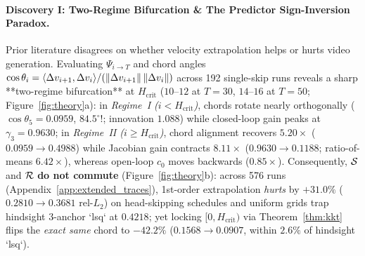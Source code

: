 \paragraph{Discovery I: Two-Regime Bifurcation \& The Predictor Sign-Inversion Paradox.}
Prior literature disagrees on whether velocity extrapolation helps \citep{liu2025taylorseer} or hurts \citep{liu2025teacache,liu2026racfgcache} video generation. Evaluating $\Psi_{i\to T}$ and chord angles $\cos\theta_i = \langle \Delta v_{i+1}, \Delta v_i\rangle / (\left\lVert \Delta v_{i+1} \right\rVert\left\lVert \Delta v_i \right\rVert)$ across 192 single-skip runs reveals a sharp **two-regime bifurcation** at $H_{\mathrm{crit}}$ ($10\text{--}12$ at $T=30$, $14\text{--}16$ at $T=50$; Figure~\ref{fig:theory}a): in \emph{Regime~I ($i < H_{\mathrm{crit}}$)}, chords rotate nearly orthogonally ($\cos\theta_5 = \mathbf{0.0959}$, $\mathbf{84.5^\circ}$!; innovation $1.088$) while closed-loop gain peaks at $\gamma_3 = \mathbf{0.9630}$; in \emph{Regime~II ($i \ge H_{\mathrm{crit}}$)}, chord alignment recovers $\mathbf{5.20\times}$ ($0.0959 \to 0.4988$) while Jacobian gain contracts $\mathbf{8.11\times}$ ($0.9630 \to 0.1188$; ratio-of-means $6.42\times$), whereas open-loop $c_0$ moves backwards ($0.85\times$). Consequently, $\mathcal{S}$ and $\mathcal{R}$ \textbf{do not commute} (Figure~\ref{fig:theory}b): across 576 runs (Appendix~\ref{app:extended_traces}), 1st-order extrapolation \emph{hurts} by $\mathbf{+31.0\%}$ ($0.2810 \to 0.3681$ rel-$L_2$) on head-skipping schedules and uniform grids trap hindsight 3-anchor `lsq` at $0.4218$; yet locking $[0, H_{\mathrm{crit}})$ via Theorem~\ref{thm:kkt} flips the \emph{exact same} chord to $\mathbf{-42.2\%}$ ($0.1568 \to 0.0907$, within $2.6\%$ of hindsight `lsq`).

